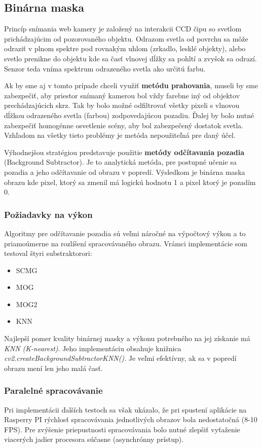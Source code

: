 \subsection{Binárna maska}
Princíp snímania web kamery je založený na interakcii CCD čipu  so svetlom prichádzajúcim od pozorovaného objektu. Odrazom svetla od povrchu sa môže odraziť v plnom spektre pod rovnakým uhlom (zrkadlo, lesklé objekty), alebo svetlo prenikne do objektu kde sa časť vlnovej dĺžky sa pohltí a zvyšok sa odrazí. Senzor teda vníma spektrum odrazeného svetla ako určitú farbu.

Ak by sme aj v tomto prípade chceli využiť  \textbf{metódu prahovania}, museli by sme zabezpečiť, aby priestor snímaný kamerou bol vždy farebne iný od objektov prechádzajúcich skrz. Tak by bolo možné odfiltrovať všetky pixeli s vlnovou dĺžkou odrazeného svetla (farbou) zodpovedajúcou pozadiu. Ďalej by bolo nutné zabezpečiť homogénne osvetlenie scény, aby bol zabezpečený dostatok svetla. Vzhľadom na všetky tieto problémy je metóda nepoužiteľná pre daný účel.

Výhodnejšou stratégiou predstavuje použitie \textbf{metódy odčítavania pozadia} (Background Subtractor). Je to analytická metóda, pre postupné učenie sa pozadia a jeho odčítavanie od obrazu v popredí. Výsledkom je binárna maska obrazu kde pixel, ktorý sa zmenil má logickú hodnotu 1 a pixel ktorý je pozadím 0. 

\subsubsection{Požiadavky na výkon}
Algoritmy pre odčítavanie pozadia sú veľmi náročné na výpočtový výkon  a to priamoúmerne na rozlíšení spracovávaného obrazu. Vrámci  implementácie som testoval štyri substraktorori:
\begin{itemize}
\item SCMG
\item MOG
\item MOG2
\item KNN
\end{itemize}

Najlepší pomer kvality binárnej masky a výkonu potrebného na jej získanie má \textit{KNN (K-nearest)}. Jeho implementáciu obsahuje knižnica  \textit{cv2.createBackgroundSubtractorKNN()}. Je veľmi efektívny, ak sa v popredí obrazu mení len jeho malá časť. 

\subsubsection{Paralelné spracovávanie}
Pri implementácii ďalších testoch sa však ukázalo, že pri spustení aplikácie na Rasperry PI rýchlosť spracovávania jednotlivých obrazov bola nedostatočná (8-10 FPS). Pre zvýšenie priepustnosti spracovávania bolo nutné zlepšiť vyťaženie viacerých jadier procesora súčasne (asynchrónny prístup). 

